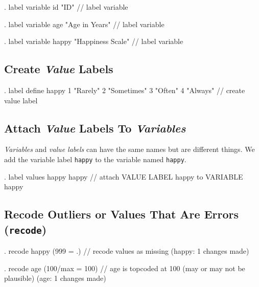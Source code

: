 \documentclass[]{article}
\begin{document}
\begin{stlog}
. label variable id "ID" // label variable
\end{stlog}

\begin{stlog}
. label variable age "Age in Years" // label variable
\end{stlog}

\begin{stlog}
. label variable happy "Happiness Scale" // label variable
\end{stlog}

\subsection{\texorpdfstring{Create \emph{Value}
Labels}{Create Value Labels}}\label{create-value-labels}

\begin{stlog}
. label define happy 1 "Rarely" 2 "Sometimes" 3 "Often" 4 "Always" // create value label
\end{stlog}

\subsection{\texorpdfstring{Attach \emph{Value} Labels To
\emph{Variables}}{Attach Value Labels To Variables}}\label{attach-value-labels-to-variables}

\emph{Variables} and \emph{value labels} can have the same names but are
different things. We add the variable label \texttt{happy} to the
variable named \texttt{happy}.

\begin{stlog}
. label values happy happy // attach VALUE LABEL happy to VARIABLE happy
\end{stlog}

\subsection{\texorpdfstring{Recode Outliers or Values That Are Errors
(\texttt{recode})}{Recode Outliers or Values That Are Errors (recode)}}\label{recode-outliers-or-values-that-are-errors-recode}

\begin{stlog}
. recode happy (999 = .) // recode values as missing
(happy: 1 changes made)
\end{stlog}

\begin{stlog}
. recode age (100/max = 100) // age is topcoded at 100 (may or may not be plausible)
(age: 1 changes made)
\end{stlog}
\end{document}
